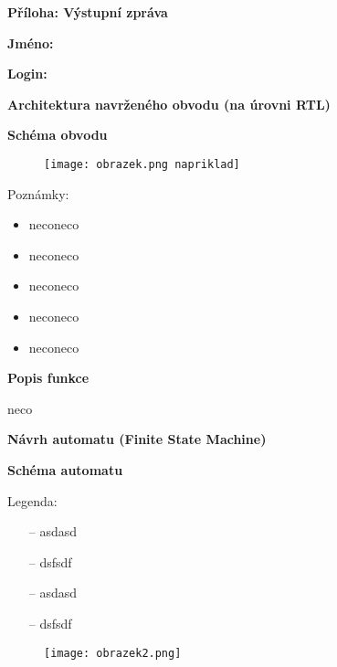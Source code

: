 \documentclass[11pt,a4paper]{article}
\begin{document}
\selectfont
\huge \textbf{\color{violet}Příloha: Výstupní zpráva}

\bigskip

\large \textbf{Jméno: }

\large \textbf{Login: }

\bigskip

\Large \textbf{\color{violet}Architektura navrženého obvodu (na úrovni RTL)}

\bigskip

\large \textbf{\color{violet}Schéma obvodu}

\bigskip

\begin{figure}[h]
    \centering
    \texttt{[image: obrazek.png napriklad]}
\end{figure}


\bigskip

Poznámky:

\begin{itemize}
\setlength\itemsep{-1mm}
    \item \quad neconeco
    \item \quad neconeco
    \item \quad neconeco
    \item \quad neconeco
    \item \quad neconeco
\end{itemize}

\bigskip

\large \textbf{\color{violet}Popis funkce}

\bigskip

neco

\newpage
\Large \textbf{\color{violet}Návrh automatu (Finite State Machine)}

\bigskip

\large \textbf{\color{violet}Schéma automatu}

\bigskip
Legenda:
\begin{itemize}
\setlength\itemsep{-1mm}
    \item[--] \quad asdasd
    \item[--] \quad dsfsdf
    \item[--] \quad asdasd
    \item[--] \quad dsfsdf
\end{itemize}

\bigskip

\begin{figure}[h]
    \centering
    \texttt{[image: obrazek2.png]}
\end{figure}
\end{document}
